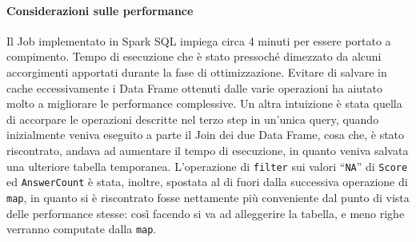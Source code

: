   \paragraph{Considerazioni sulle performance}\label{par:job2:spark:performance}

  Il Job implementato in Spark SQL impiega circa 4 minuti per essere portato a compimento.
  Tempo di esecuzione che è stato pressoché dimezzato da alcuni accorgimenti apportati durante la fase di ottimizzazione.
  Evitare di salvare in cache eccessivamente i Data Frame ottenuti dalle varie operazioni ha aiutato molto a migliorare
  le performance complessive.
  Un altra intuizione è stata quella di accorpare le operazioni descritte nel terzo step in un'unica query, quando inizialmente
  veniva eseguito a parte il Join dei due Data Frame, cosa che, è stato riscontrato, andava ad aumentare il tempo di esecuzione,
  in quanto veniva salvata una ulteriore tabella temporanea.
  L'operazione di \texttt{filter} sui valori ``\texttt{NA}'' di \texttt{Score} ed \texttt{AnswerCount} è stata, inoltre, spostata al di fuori
  dalla successiva operazione di \texttt{map}, in quanto si è riscontrato fosse nettamente più conveniente dal punto di vista
  delle performance stesse: così facendo si va ad alleggerire la tabella, e meno righe verranno computate dalla \texttt{map}.

